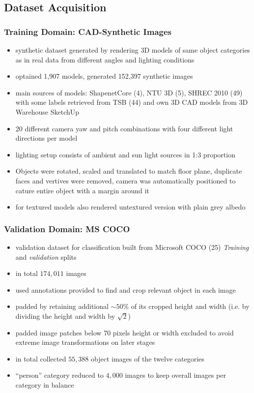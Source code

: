 \documentclass[]{article}
\begin{document}
\subsection{Dataset Acquisition}
\subsubsection{Training Domain: CAD-Synthetic Images}
\begin{itemize}
	\item synthetic dataset generated by rendering 3D models of same object categories as in real data from different angles and lighting conditions
	\item optained 1,907 models, generated 152,397 synthetic images
	\item main sources of models: ShapenetCore (4), NTU 3D (5), SHREC 2010 (49) with some labels retrieved from TSB (44) and own 3D CAD models from 3D Warehouse SketchUp
	\item 20 different camera yaw and pitch combinations with four different light directions per model
	\item lighting setup consists of ambient and sun light sources in 1:3 proportion
	\item Objects were rotated, scaled and translated to match floor plane, duplicate faces and vertives were removed, camera was automatically positioned to cature entire object with a margin around it
	\item for textured models also rendered untextured version with plain grey albedo
\end{itemize}

\subsubsection{Validation Domain: MS COCO}
\begin{itemize}
	\item validation dataset for classification built from Microsoft COCO (25) \textit{Training} and \textit{validation} splits
	\item in total $174,011$ images
	\item used annotations provided to find and crop relevant object in each image
	\item padded by retaining additional $\sim 50\%$ of its cropped height and width (i.e. by dividing the height and width by $\sqrt{2}$)
	\item padded image patches below 70 pixels height or width excluded to avoid extreme image transformations on later stages
	\item in total collected $55,388$ object images of the twelve categories
	\item ``person'' category reduced to $4,000$ images to keep overall images per category in balance
\end{itemize}
\end{document}
